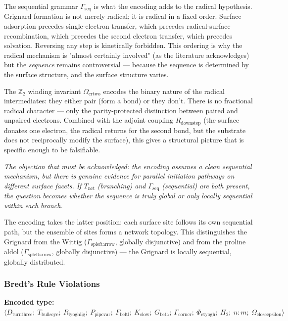\documentclass[12pt,a4paper]{article}
\begin{document}
The sequential grammar $\Gamma_\textrm{seq}$ is what the encoding adds to the radical hypothesis. Grignard formation is not merely radical; it is radical in a fixed order. Surface adsorption precedes single-electron transfer, which precedes radical-surface recombination, which precedes the second electron transfer, which precedes solvation. Reversing any step is kinetically forbidden. This ordering is why the radical mechanism is "almost certainly involved" (as the literature acknowledges) but the \emph{sequence} remains controversial --- because the sequence is determined by the surface structure, and the surface structure varies.

The $\mathbb{Z}_2$ winding invariant $\Omega_{\text{crtwo}}$ encodes the binary nature of the radical intermediates: they either pair (form a bond) or they don't. There is no fractional radical character --- only the parity-protected distinction between paired and unpaired electrons. Combined with the adjoint coupling $R_{\text{downstep}}$ (the surface donates one electron, the radical returns for the second bond, but the substrate does not reciprocally modify the surface), this gives a structural picture that is specific enough to be falsifiable.

\emph{The objection that must be acknowledged: the encoding assumes a clean sequential mechanism, but there is genuine evidence for parallel initiation pathways on different surface facets. If $T_\textrm{net}$ (branching) and $\Gamma_\textrm{seq}$ (sequential) are both present, the question becomes whether the sequence is truly global or only locally sequential within each branch.} 

The encoding takes the latter position: each surface site follows its own sequential path, but the ensemble of sites forms a network topology. This distinguishes the Grignard from the Wittig ($\Gamma_{\text{spleftarrow}}$, globally disjunctive) and from the proline aldol ($\Gamma_{\text{spleftarrow}}$, globally disjunctive) --- the Grignard is locally sequential, globally distributed.

\subsubsection{Bredt's Rule Violations}

\textbf{Encoded type:} $\langle D_{\text{turnthree}};\ T_{\text{bullseye}};\ R_{\text{lyoghlig}};\ P_{\text{pipevar}};\ F_{\text{beltl}};\ K_\textrm{slow};\ G_{\text{beta}};\ \Gamma_{\text{corner}};\ \Phi_{\text{ctyogh}};\ H_2;\ n{:}m;\ \Omega_{\text{closeepsilon}} \rangle$
\end{document}
